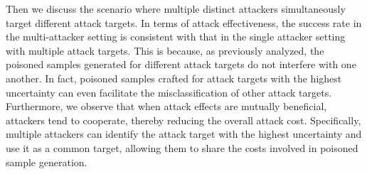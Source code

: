 Then we discuss the scenario where multiple distinct attackers simultaneously target different attack targets.
In terms of attack effectiveness, the success rate in the multi-attacker setting is consistent with that in the single attacker setting with multiple attack targets.
This is because, as previously analyzed, the poisoned samples generated for different attack targets do not interfere with one another.
In fact, poisoned samples crafted for attack targets with the highest uncertainty can even facilitate the misclassification of other attack targets.
Furthermore, we observe that when attack effects are mutually beneficial, attackers tend to cooperate, thereby reducing the overall attack cost. Specifically, multiple attackers can identify the attack target with the highest uncertainty and use it as a common target, allowing them to share the costs involved in poisoned sample generation.
\begin{table}[h!]
	\caption{Multi-Target Attack across Four Ddatasets}
	\label{tab: asz }
	\setlength{\tabcolsep}{5.8pt}
	\begin{center}
	\end{center}
\end{table}


